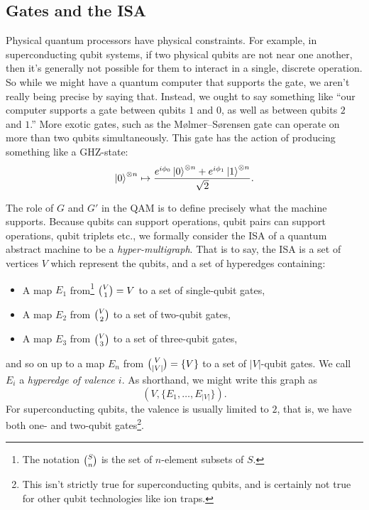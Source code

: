 \subsection{Gates and the ISA}
Physical quantum processors have physical constraints. For example, in superconducting qubit systems, if two physical qubits are not near one another, then it's generally not possible for them to interact in a single, discrete operation. So while we might have a quantum computer that supports the \CNOT{} gate, we aren't really being precise by saying that. Instead, we ought to say something like ``our computer supports a \CNOT{} gate between qubits $1$ and $0$, as well as between qubits $2$ and $1$.'' More exotic gates, such as the M{\o}lmer--S{\o}rensen gate\cite{molmer} can operate on more than two qubits simultaneously. This gate has the action of producing something like a GHZ-state:
\begin{displaymath}
\ket{0}^{\otimes n} \mapsto \frac{e^{i\phi_0}\ket{0}^{\otimes n} + e^{i\phi_1}\ket{1}^{\otimes n}}{\sqrt{2}}.
\end{displaymath}

The role of $G$ and $G'$ in the QAM is to define precisely what the machine supports. Because qubits can support operations, qubit pairs can support operations, qubit triplets etc., we formally consider the ISA of a quantum abstract machine to be a \emph{hyper-multigraph}. That is to say, the ISA is a set of vertices $V$ which represent the qubits, and a set of hyperedges containing:
\begin{itemize}
    \item A map $E_1$ from\footnote{The notation $\tbinom S n$ is the set of $n$-element subsets of $S$.} $\tbinom V 1 = V$ to a set of single-qubit gates,
    \item A map $E_2$ from $\tbinom V 2$ to a set of two-qubit gates,
    \item A map $E_3$ from $\tbinom V 3$ to a set of three-qubit gates,
\end{itemize}
and so on up to a map $E_n$ from $\tbinom V {\vert V\vert} = \{V\}$ to a set of $\vert V\vert$-qubit gates. We call $E_i$ a \emph{hyperedge of valence $i$}. As shorthand, we might write this graph as \[\left(V,\{E_1,\ldots,E_{\vert V\vert}\}\right).\] For superconducting qubits, the valence is usually limited to $2$, that is, we have both one- and two-qubit gates\footnote{This isn't strictly true for superconducting qubits, and is certainly not true for other qubit technologies like ion traps.}.

